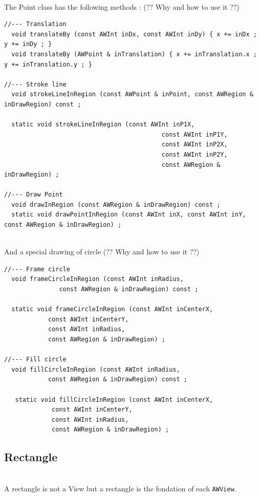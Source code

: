 \documentclass[a4paper,11pt]{extarticle}
\begin{document}
~\\ The Point class has the following methods : (?? Why and how to use it ??)

\begin{lstlisting}[language=Arduinonl]
//--- Translation
  void translateBy (const AWInt inDx, const AWInt inDy) { x += inDx ; y += inDy ; }
  void translateBy (AWPoint & inTranslation) { x += inTranslation.x ; y += inTranslation.y ; }

//--- Stroke line
  void strokeLineInRegion (const AWPoint & inPoint, const AWRegion & inDrawRegion) const ;

  static void strokeLineInRegion (const AWInt inP1X,
                                           const AWInt inP1Y,
                                           const AWInt inP2X,
                                           const AWInt inP2Y,
                                           const AWRegion & inDrawRegion) ;

//--- Draw Point
  void drawInRegion (const AWRegion & inDrawRegion) const ;
  static void drawPointInRegion (const AWInt inX, const AWInt inY, const AWRegion & inDrawRegion) ;
\end{lstlisting}

~\\ And a special drawing of circle (?? Why and how to use it ??)

\begin{lstlisting}[language=Arduinonl]
//--- Frame circle
  void frameCircleInRegion (const AWInt inRadius,
               const AWRegion & inDrawRegion) const ;

  static void frameCircleInRegion (const AWInt inCenterX,
            const AWInt inCenterY,
            const AWInt inRadius,
            const AWRegion & inDrawRegion) ;

//--- Fill circle
  void fillCircleInRegion (const AWInt inRadius,
            const AWRegion & inDrawRegion) const ;

   static void fillCircleInRegion (const AWInt inCenterX,
             const AWInt inCenterY,
             const AWInt inRadius,
             const AWRegion & inDrawRegion) ;
\end{lstlisting}

\newpage
\subsection{Rectangle}

~\\ A rectangle is not a View but a rectangle is the fondation of each \texttt{AWView}.
\end{document}
